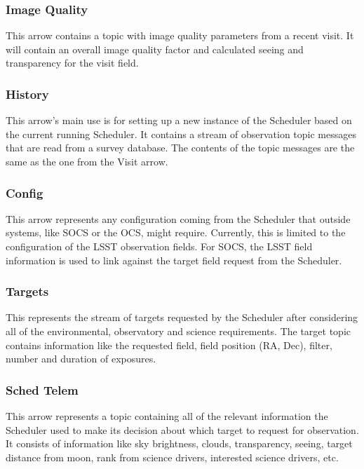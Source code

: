 \documentclass[]{spie}  %
\begin{document}
\subsubsection{Image Quality}

This arrow contains a topic with image quality parameters from a recent visit. It will contain an overall image quality factor and calculated seeing and transparency for the visit field.

\subsubsection{History}

This arrow's main use is for setting up a new instance of the Scheduler based on the current running Scheduler. It contains a stream of observation topic messages that are read from a survey database. The contents of the topic messages are the same as the one from the Visit arrow.

\subsubsection{Config}

This arrow represents any configuration coming from the Scheduler that outside systems, like SOCS or the OCS, might require. Currently, this is limited to the configuration of the LSST observation fields. For SOCS, the LSST field information is used to link against the target field request from the Scheduler.

\subsubsection{Targets}

This represents the stream of targets requested by the Scheduler after considering all of the environmental, observatory and science requirements. The target topic contains information like the requested field, field position (RA, Dec), filter, number and duration of exposures. 

\subsubsection{Sched Telem}

This arrow represents a topic containing all of the relevant information the Scheduler used to make its decision about which target to request for observation. It consists of information like sky brightness, clouds, transparency, seeing, target distance from moon, rank from science drivers, interested science drivers, etc. 
\end{document}
